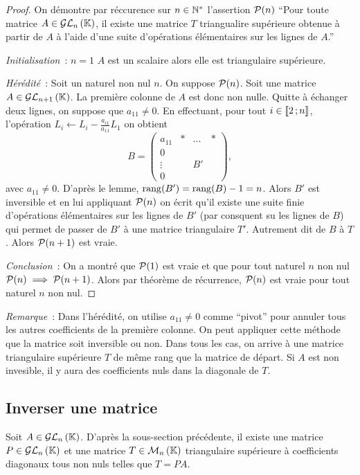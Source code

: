 \begin{proof}
  On démontre par réccurence sur $n \in \N^*$ l'assertion $\P(n)$ ``Pour toute matrice $A \in \GLn{n}{\K}$, il existe une matrice $T$ triangualire supérieure obtenue à partir de $A$ à l'aide d'une suite d'opérations élémentaires sur les lignes de $A$.''

\emph{Initialisation}~: $n=1$ $A$ est un scalaire alors elle est triangulaire supérieure.

\emph{Hérédité}~: Soit un naturel non nul $n$. On suppose $\P(n)$. Soit une matrice $A \in \GLn{n+1}{\K}$. La première colonne de $A$ est donc non nulle. Quitte à échanger deux lignes, on suppose que $a_{11}\neq 0$. En effectuant, pour tout $i \in \intervalleentier{2}{n}$, l'opération $L_i \leftarrow L_i -\frac{a_{i1}}{a_{11}}L_1$ on obtient
\begin{equation}
  B = \begin{pmatrix}
      a_{11} & * & \ldots & * \\
      0 & & & \\
      \vdots & & B' & \\
      0 & & & 
    \end{pmatrix},
\end{equation}
avec $a_{11}\neq 0$. D'après le lemme, $\rg(B')=\rg(B)-1=n$. Alors $B'$ est inversible et en lui appliquant $\P(n)$ on écrit qu'il existe une suite finie d'opérations élémentaires sur les lignes de $B'$ (par consquent su les lignes de $B$) qui permet de passer de $B'$ à une matrice triangulaire $T'$. Autrement dit de $B$ à $T$. Alors $\P(n+1)$ est vraie.

\emph{Conclusion}~: On a montré que $\P(1)$ est vraie et que pour tout naturel $n$ non nul $\P(n) \implies \P(n+1)$. Alors par théorème de récurrence, $\P(n)$ est vraie pour tout naturel $n$ non nul.
\end{proof}

\emph{Remarque}~: Dans l'hérédité, on utilise $a_{11}\neq 0$ comme ``pivot'' pour annuler tous les autres coefficients de la première colonne. On peut appliquer cette méthode que la matrice soit inversible ou non. Dans tous les cas, on arrive à  une matrice triangulaire supérieure $T$ de même rang que la matrice de départ. Si $A$ est non invesible, il y aura des coefficients nuls dans la diagonale de $T$.

\subsection{Inverser une matrice}
Soit $A \in \GLn{n}{\K}$. D'après la sous-section précédente, il existe une matrice $P \in \GLn{n}{\K}$ et une matrice $T \in \Mn{n}{\K}$ triangulaire supérieure à coefficients diagonaux tous non nuls telles que $T=PA$.

